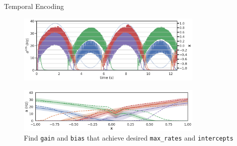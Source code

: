 \documentclass[aspectratio=169]{beamer}
\begin{document}
\begin{frame}[fragile]{Temporal Encoding}
	\begin{figure}
	    \centering
	    \includegraphics[width=0.8\textwidth]{media/atxt5.png}
	\end{figure}
	\vspace{-0.5cm}
	\begin{figure}
	    \centering
	    \includegraphics[width=0.8\textwidth]{media/tc1_wide2.png}
		\caption{Find \texttt{gain} and \texttt{bias} that achieve desired \texttt{max\_rates} and \texttt{intercepts}}
	\end{figure}
\end{frame}
\end{document}
